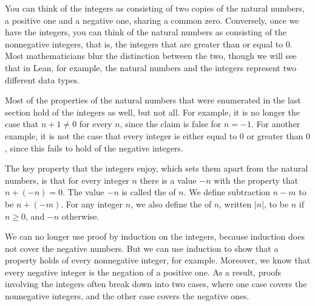 \documentclass[letterpaper,10pt,english]{sphinxmanual}
\begin{document}
\sphinxAtStartPar
You can think of the integers as consisting of two copies of the natural numbers, a positive one and a negative one, sharing a common zero. Conversely, once we have the integers, you can think of the natural numbers as consisting of the nonnegative integers, that is, the integers that are greater than or equal to \(0\). Most mathematicians blur the distinction between the two, though we will see that in Lean, for example, the natural numbers and the integers represent two different data types.

\sphinxAtStartPar
Most of the properties of the natural numbers that were enumerated in the last section hold of the integers as well, but not all. For example, it is no longer the case that \(n + 1 \neq 0\) for every \(n\), since the claim is false for \(n = -1\). For another example, it is not the case that every integer is either equal to \(0\) or greater than \(0\), since this fails to hold of the negative integers.

\sphinxAtStartPar
The key property that the integers enjoy, which sets them apart from the natural numbers, is that for every integer \(n\) there is a value \(-n\) with the property that \(n + (-n) = 0\). The value \(-n\) is called the  of \(n\). We define subtraction \(n - m\) to be \(n + (-m)\). For any integer \(n\), we also define the  of \(n\), written \(|n|\), to be \(n\) if \(n \geq 0\), and \(-n\) otherwise.

\sphinxAtStartPar
We can no longer use proof by induction on the integers, because induction does not cover the negative numbers. But we can use induction to show that a property holds of every nonnegative integer, for example. Moreover, we know that every negative integer is the negation of a positive one. As a result, proofs involving the integers often break down into two cases, where one case covers the nonnegative integers, and the other case covers the negative ones.
\end{document}
